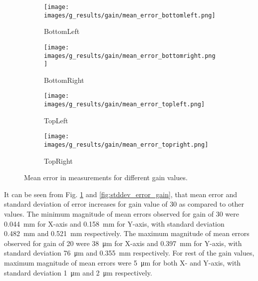 
    \begin{figure}[ht]
        \centering
        \begin{subfigure}[b]{0.46\textwidth}
            \centering
            \texttt{[image: images/g\_results/gain/mean\_error\_bottomleft.png]}
            \caption{\textsf{BottomLeft}}
        \end{subfigure}
        \hspace{1cm}
        \begin{subfigure}[b]{0.46\textwidth}
            \centering
            \texttt{[image: images/g\_results/gain/mean\_error\_bottomright.png]}
            \caption{\textsf{BottomRight}}
        \end{subfigure}

        \vspace{5mm}
        
        \begin{subfigure}[b]{0.46\textwidth}
            \centering
            \texttt{[image: images/g\_results/gain/mean\_error\_topleft.png]}
            \caption{\textsf{TopLeft}}
        \end{subfigure}
        \hspace{1cm}
        \begin{subfigure}[b]{0.46\textwidth}
            \centering
            \texttt{[image: images/g\_results/gain/mean\_error\_topright.png]}
            \caption{\textsf{TopRight}}
        \end{subfigure}

        \caption{Mean error in measurements for different gain values.}
        \label{fig:mean_error_gain}
    \end{figure}

    \noindent It can be seen from Fig. \ref{fig:mean_error_gain} and \ref{fig:stddev_error_gain}, that mean error and standard deviation of error increases for gain value of 30 as compared to other values. The minimum magnitude of mean errors observed for gain of 30 were \SI{0.044}{\milli\meter} for X-axis and \SI{0.158}{\milli\meter} for Y-axis, with standard deviation \SI{0.482}{\milli\meter} and \SI{0.521}{\milli\meter} respectively. The maximum magnitude of mean errors observed for gain of 20 were \SI{38}{\micro\meter} for X-axis and \SI{0.397}{\milli\meter} for Y-axis, with standard deviation \SI{76}{\micro\meter} and \SI{0.355}{\milli\meter} respectively. For rest of the gain values, maximum magnitude of mean errors were \SI{5}{\micro\meter} for both X- and Y-axis, with standard deviation \SI{1}{\micro\meter} and \SI{2}{\micro\meter} respectively.

